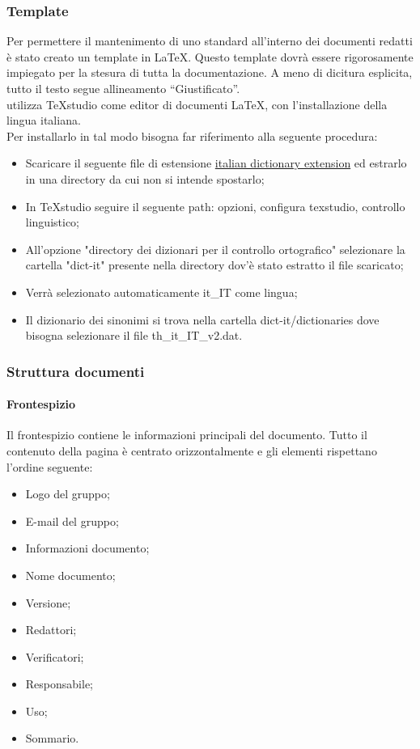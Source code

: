 \subsubsection{Template}
Per permettere il mantenimento di uno standard all’interno dei documenti redatti è stato creato un template in \LaTeX. Questo template dovrà essere rigorosamente impiegato per la stesura di tutta la documentazione. A meno di dicitura esplicita, tutto il testo segue allineamento “Giustificato”.\\
\groupName{} utilizza TeXstudio come editor di documenti \LaTeX, con l'installazione della lingua italiana. \\Per installarlo in tal modo bisogna far riferimento alla seguente procedura:
\begin{itemize}
	\item Scaricare il seguente file di estensione \href{https://extensions.libreoffice.org/extensions/italian-dictionary-thesaurus-hyphenation-patterns/4.2/@@download/file/dict-it.oxt}{italian dictionary extension} ed estrarlo in una directory da cui non si intende spostarlo;
	\item In TeXstudio seguire il seguente path: opzioni, configura texstudio, controllo linguistico;
	\item All'opzione "directory dei dizionari per il controllo ortografico" selezionare la cartella "dict-it" presente nella directory dov'è stato estratto il file scaricato;
	\item Verrà selezionato automaticamente it\_IT come lingua;
	\item Il dizionario dei sinonimi  si trova nella cartella dict-it/dictionaries dove bisogna selezionare il file th\_it\_IT\_v2.dat.
\end{itemize}

\subsubsection{Struttura documenti}

\paragraph{Frontespizio}
Il frontespizio contiene le informazioni principali del documento. Tutto il contenuto della pagina è centrato orizzontalmente e gli elementi rispettano l’ordine seguente:

\begin{itemize}
	\item Logo del gruppo;
	\item E-mail del gruppo;
	\item Informazioni documento;
	\item Nome documento;
	\item Versione;
	\item Redattori;
	\item Verificatori;
	\item Responsabile;
	\item Uso;
	\item Sommario.
\end{itemize}

